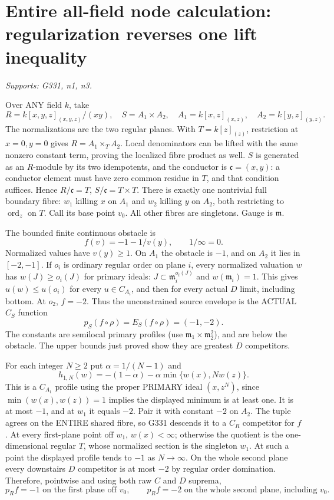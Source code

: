 \section{Entire all-field node calculation: regularization reverses one lift inequality}
\textit{Supports: G331, n1, n3.}

Over ANY field $k$, take
\[
R=k[x,y,z]_{(x,y,z)}/(xy),\quad S=A_1\times A_2,
\quad A_1=k[x,z]_{(x,z)},\quad A_2=k[y,z]_{(y,z)}.
\]
The normalizations are the two regular planes. With $T=k[z]_{(z)}$, restriction at $x=0,y=0$ gives $R=A_1\times_T A_2$. Local denominators can be lifted with the same nonzero constant term, proving the localized fibre product as well. $S$ is generated as an $R$-module by its two idempotents, and the conductor is $\mathfrak c=(x,y)$: a conductor element must have zero common residue in $T$, and that condition suffices. Hence $R/\mathfrak c=T$, $S/\mathfrak c=T\times T$. There is exactly one nontrivial full boundary fibre: $w_1$ killing $x$ on $A_1$ and $w_2$ killing $y$ on $A_2$, both restricting to $\operatorname{ord}_z$ on $T$. Call its base point $v_0$. All other fibres are singletons. Gauge is $\mathfrak m$.

The bounded finite continuous obstacle is
\[
f(v)=-1-1/v(y),\qquad1/\infty=0.
\]
Normalized values have $v(y)\ge1$. On $A_1$ the obstacle is $-1$, and on $A_2$ it lies in $[-2,-1]$. If $o_i$ is ordinary regular order on plane $i$, every normalized valuation $w$ has $w(J)\ge o_i(J)$ for primary ideals: $J\subset\mathfrak m_i^{o_i(J)}$ and $w(\mathfrak m_i)=1$. This gives $u(w)\le u(o_i)$ for every $u\in C_{A_i}$, and then for every actual $D$ limit, including bottom. At $o_2$, $f=-2$. Thus the unconstrained source envelope is the ACTUAL $C_S$ function
\[
p_S(f\circ\rho)=E_S(f\circ\rho)=(-1,-2).              \tag{13}
\]
The constants are semilocal primary profiles (use $\mathfrak m_1\times\mathfrak m_2^2$), and are below the obstacle. The upper bounds just proved show they are greatest $D$ competitors.

For each integer $N\ge2$ put $\alpha=1/(N-1)$ and
\[
h_{1,N}(w)=-(1-\alpha)-\alpha\min\{w(x),Nw(z)\}.
\]
This is a $C_{A_1}$ profile using the proper PRIMARY ideal $(x,z^N)$, since $\min(w(x),w(z))=1$ implies the displayed minimum is at least one. It is at most $-1$, and at $w_1$ it equals $-2$. Pair it with constant $-2$ on $A_2$. The tuple agrees on the ENTIRE shared fibre, so G331 descends it to a $C_R$ competitor for $f$. At every first-plane point off $w_1$, $w(x)<\infty$; otherwise the quotient is the one-dimensional regular $T$, whose normalized section is the singleton $w_1$. At such a point the displayed profile tends to $-1$ as $N\to\infty$. On the whole second plane every downstairs $D$ competitor is at most $-2$ by regular order domination. Therefore, pointwise and using both raw $C$ and $D$ suprema,
\[
p_R f=-1\text{ on the first plane off }v_0,
\qquad p_R f=-2\text{ on the whole second plane, including }v_0. \tag{14}
\]

